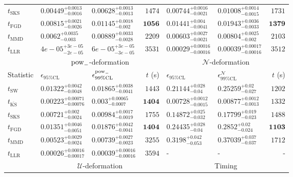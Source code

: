 \begin{tabular}{l|llr|llr}
	$t_{\mathrm{SKS}}$ & $0.00449_{-0.0016}^{+0.0013}$ & $0.00628_{-0.0013}^{+0.0013}$ & $1474$ & $0.00744_{-0.0021}^{+0.0016}$ & $0.01008_{-0.0015}^{+0.0014}$ & $1731$ \\
	$t_{\mathrm{FGD}}$ & $0.00815_{-0.0026}^{+0.0021}$ & $0.01145_{-0.002}^{+0.0018}$ & ${\mathbf{1056}}$ & $0.01441_{-0.0041}^{+0.004}$ & $0.01943_{-0.0033}^{+0.0036}$ & ${\mathbf{1379}}$ \\
	$t_{\mathrm{MMD}}$ & $0.0062_{-0.003}^{+0.0035}$ & $0.00889_{-0.0028}^{+0.0033}$ & $2209$ & $0.00603_{-0.0021}^{+0.0027}$ & $0.00804_{-0.002}^{+0.0025}$ & $2103$ \\
	$t_{\mathrm{LLR}}$ & $4e-05_{-2e-05}^{+3e-05}$ & $6e-05_{-3e-05}^{+3e-05}$ & $3531$ & $0.00029_{-0.00016}^{+0.00016}$ & $0.00039_{-0.00016}^{+0.00017}$ & $3512$ \\
	\toprule
	\multicolumn{1}{c}{} & \multicolumn{3}{c}{$\rm{pow}_{-}$-deformation} & \multicolumn{3}{c}{$\mathcal{N}$-deformation} \\
	Statistic & $\epsilon_{95\%\mathrm{CL}}$ & $\epsilon^  {\rm{pow}_{-}}_{99\%\mathrm{CL}}$ & $t$ (s) & $\epsilon_{95\%\mathrm{CL}}$ & $\epsilon^    {\mathcal{N}}_{99\%\mathrm{CL}}$ & $t$ (s) \\
	\midrule
	$t_{\mathrm{SW}}$ & $0.01322_{-0.0048}^{+0.0042}$ & $0.01865_{-0.0041}^{+0.0038}$ & $1443$ & $0.21144_{-0.04}^{+0.028}$ & $0.25259_{-0.027}^{+0.02}$ & $1202$ \\
	$t_{\overline{\mathrm{KS}}}$ & ${\mathbf{0.00223_{-0.00076}^{+0.00071}}}$ & ${\mathbf{0.003_{-0.0007}^{+0.00065}}}$ & ${\mathbf{1404}}$ & ${\mathbf{0.00728_{-0.0015}^{+0.0012}}}$ & ${\mathbf{0.00877_{-0.0013}^{+0.0012}}}$ & $1332$ \\
	$t_{\mathrm{SKS}}$ & $0.00721_{-0.0024}^{+0.002}$ & $0.00984_{-0.0019}^{+0.0017}$ & $1755$ & $0.14872_{-0.032}^{+0.025}$ & $0.17799_{-0.023}^{+0.019}$ & $1488$ \\
	$t_{\mathrm{FGD}}$ & $0.01351_{-0.0051}^{+0.0046}$ & $0.01876_{-0.0041}^{+0.0042}$ & ${\mathbf{1404}}$ & $0.24435_{-0.04}^{+0.028}$ & $0.2852_{-0.024}^{+0.02}$ & ${\mathbf{1103}}$ \\
	$t_{\mathrm{MMD}}$ & $0.00523_{-0.0024}^{+0.0029}$ & $0.00739_{-0.0023}^{+0.0027}$ & $3255$ & $0.3198_{-0.053}^{+0.042}$ & $0.37039_{-0.037}^{+0.037}$ & $1712$ \\
	$t_{\mathrm{LLR}}$ & $0.00026_{-0.00017}^{+0.00016}$ & $0.00039_{-0.00016}^{+0.00016}$ & $3594$ & - & - & - \\
	\toprule
	\multicolumn{1}{c}{} & \multicolumn{3}{c}{$\mathcal{U}$-deformation} & \multicolumn{3}{c}{Timing} \\

\end{tabular}
